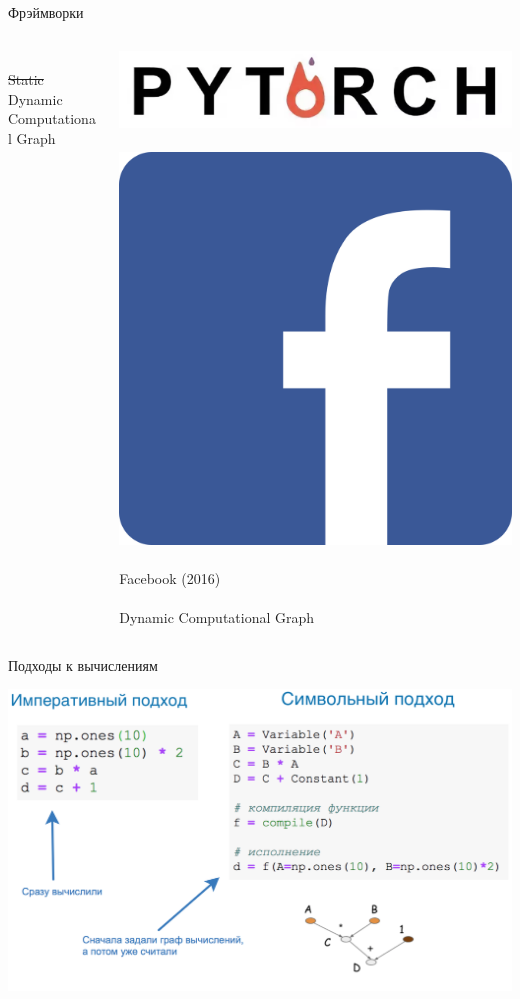 \documentclass[notes,12pt, aspectratio=169]{beamer}
\begin{document}
\begin{frame}{Фрэймворки}
\begin{columns}[T]
\begin{column}{.33\textwidth}
		\mbox{ } \\
		\sout{Static}  Dynamic Computational Graph 
	\end{column}%
	\hfill%
	\begin{column}{.33\textwidth}
		\centering 	\includegraphics[width=.7\linewidth]{pytorch.png} \\
		\mbox{ } \\
		\centering 	\includegraphics[width=.3\linewidth]{facebook.png} \\
		\mbox{ } \\
		Facebook (2016) \\ 
		\mbox{ } \\
		Dynamic Computational Graph 
	\end{column}%
\end{columns}
\end{frame}




\begin{frame}{Подходы к вычислениям}
\begin{center}
	\includegraphics[width=.85\linewidth]{graph.png}
\end{center}
\end{frame} 
\end{document}
